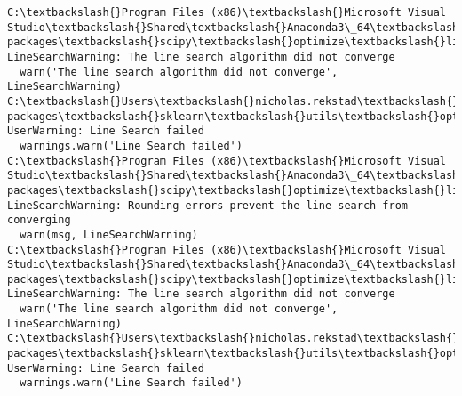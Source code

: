 \documentclass[11pt]{article}
\begin{document}
    \begin{Verbatim}[commandchars=\\\{\}]
C:\textbackslash{}Program Files (x86)\textbackslash{}Microsoft Visual Studio\textbackslash{}Shared\textbackslash{}Anaconda3\_64\textbackslash{}lib\textbackslash{}site-packages\textbackslash{}scipy\textbackslash{}optimize\textbackslash{}linesearch.py:313: LineSearchWarning: The line search algorithm did not converge
  warn('The line search algorithm did not converge', LineSearchWarning)
C:\textbackslash{}Users\textbackslash{}nicholas.rekstad\textbackslash{}AppData\textbackslash{}Roaming\textbackslash{}Python\textbackslash{}Python36\textbackslash{}site-packages\textbackslash{}sklearn\textbackslash{}utils\textbackslash{}optimize.py:195: UserWarning: Line Search failed
  warnings.warn('Line Search failed')
C:\textbackslash{}Program Files (x86)\textbackslash{}Microsoft Visual Studio\textbackslash{}Shared\textbackslash{}Anaconda3\_64\textbackslash{}lib\textbackslash{}site-packages\textbackslash{}scipy\textbackslash{}optimize\textbackslash{}linesearch.py:422: LineSearchWarning: Rounding errors prevent the line search from converging
  warn(msg, LineSearchWarning)
C:\textbackslash{}Program Files (x86)\textbackslash{}Microsoft Visual Studio\textbackslash{}Shared\textbackslash{}Anaconda3\_64\textbackslash{}lib\textbackslash{}site-packages\textbackslash{}scipy\textbackslash{}optimize\textbackslash{}linesearch.py:313: LineSearchWarning: The line search algorithm did not converge
  warn('The line search algorithm did not converge', LineSearchWarning)
C:\textbackslash{}Users\textbackslash{}nicholas.rekstad\textbackslash{}AppData\textbackslash{}Roaming\textbackslash{}Python\textbackslash{}Python36\textbackslash{}site-packages\textbackslash{}sklearn\textbackslash{}utils\textbackslash{}optimize.py:195: UserWarning: Line Search failed
  warnings.warn('Line Search failed')

    \end{Verbatim}
\end{document}
